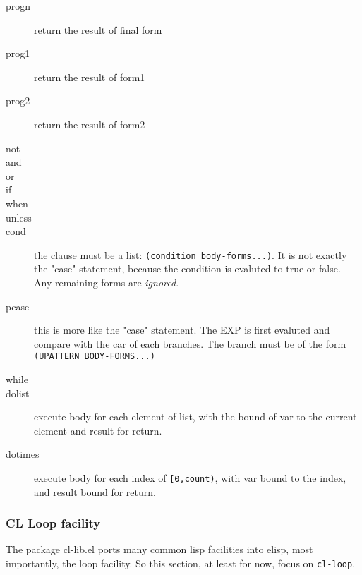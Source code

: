 \begin{description}
\item [progn ] return the result of final form
\item [prog1 ] return the result of form1
\item [prog2 ] return the result of form2
\item [not]
\item [and]
\item [or]
\item [if ]
\item [when ]
\item [unless ]
\item [cond ] the clause must be a list:
  \texttt{(condition body-forms...)}.  It is not exactly the "case"
  statement, because the condition is evaluted to true or false.  Any
  remaining forms are \textit{ignored}.
\item [pcase ] this is more like
  the "case" statement. The EXP is first evaluted and compare with the
  car of each branches.  The branch must be of the form
  \texttt{(UPATTERN BODY-FORMS...)}
\item [while ]
\item [dolist ] execute body for each
  element of list, with the bound of var to the current element and
  result for return.
\item [dotimes ] execute body for
  each index of \texttt{[0,count)}, with var bound to the index, and
  result bound for return.
\end{description}

\subsubsection{CL Loop facility}
The package cl-lib.el ports many common lisp facilities into elisp,
most importantly, the loop facility.  So this section, at least for
now, focus on \texttt{cl-loop}.

